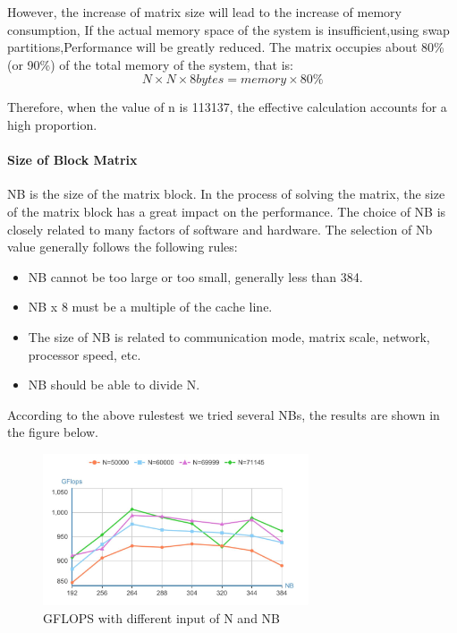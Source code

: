 \documentclass[a4paper,12pt]{article}
\begin{document}
However, the increase of matrix size will lead to the increase of memory consumption, If the actual memory space of the system is insufficient,using swap partitions,Performance will be greatly reduced. The matrix occupies about 80\% (or 90\%) of the total memory of the system, that is:
\begin{equation*}
N \times N \times 8bytes = memory \times 80\%
\end{equation*}

Therefore, when the value of n is 113137, the effective calculation accounts for a high proportion.

\paragraph{Size of Block Matrix}

NB is the size of the matrix block. In the process of solving the matrix, the size of the matrix block has a great impact on the performance. The choice of NB is closely related to many factors of software and hardware. The selection of Nb value generally follows the following rules:
\begin{itemize}
    \item NB cannot be too large or too small, generally less than 384.
    \item NB x 8 must be a multiple of the cache line.
    \item The size of NB is related to communication mode, matrix scale, network, processor speed, etc.
    \item NB should be able to divide N.
\end{itemize}

According to the above rulestest we tried several NBs, the results are shown in the figure below.

\begin{figure}[H]
    \centering
    \includegraphics[width=0.7\textwidth]{GFLOPS_NB.png}
    \caption{GFLOPS with different input of N and NB}
    \label{fig:gflops_nb}
\end{figure}
\end{document}
